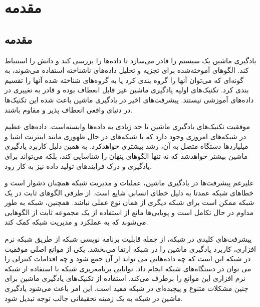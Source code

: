


\chapter{مقدمه}



\section{مقدمه}


یادگیری ماشین یک سیستم را قادر می‌سازد تا داده‌ها را بررسی کند و دانش را استنباط کند. الگوهای آموخته‌شده برای تجزیه و تحلیل داده‌های ناشناخته استفاده می‌شوند، به گونه‌ای که می‌توان آنها را گروه بندی کرد یا به گروه‌های شناخته شده آنها را تقسیم بندی کرد. تکنیک‌های اولیه یادگیری ماشین غیر قابل انعطاف بوده و قادر به تغییری در داده‌های آموزشی نیستند. پیشرفت‌های اخیر در یادگیری ماشین باعث شده این تکنیک‌ها در دنیای واقعی انعطاف پذیر و مقاوم باشند.



موفقیت تکنیک‌های یادگیری ماشین تا حد زیادی به داده‌ها وابسته‌است. داده‌های عظیم در شبکه‌های امروزی وجود دارد که با شبکه‌های در حال ظهوری مانند اینترنت اشیا و میلیاردها دستگاه متصل به آن، رشد بیشتری خواهدکرد. به همین دلیل کاربرد یادگیری ماشین بیشتر خواهدشد که نه تنها الگوهای پنهان را شناسایی کند، بلکه می‌تواند برای یادگیری و درک فرایندهای تولید داده نیز به کار رود.



علیرغم پیشرفت‌ها در یادگیری ماشین، عملیات و مدیریت شبکه همچنان دشوار است و خطاهای شبکه عمدتا به دلیل خطای انسانی شایع است. از طرفی الگوهای ثابت در یک شبکه ممکن است برای شبکه دیگری از همان نوع عملی نباشد. همچنین، شبکه به طور مداوم در حال تکامل است و پویایی‌ها مانع از استفاده از یک مجموعه ثابت از الگوهایی می‌شوند که به عملکرد و مدیریت شبکه کمک کند.



پیشرفت‌های کلیدی در شبکه، از جمله قابلیت برنامه نویسی شبکه از طریق شبکه نرم افزاری، کاربرد یادگیری ماشین را در شبکه ارتقا می‌بخشد. یکی از موانع اصلی موفقیت در شبکه‌ این است که چه داده‌هایی می تواند از آن جمع شود و چه اقدامات کنترلی را می توان در دستگاه‌های شبکه انجام داد. توانایی برنامه‌ریزی شبکه با استفاده از شبکه نرم افزاری این موانع را برطرف می‌کند. استفاده از تکنیک‌های یادگیری ماشین برای چنین مشکلات متنوع و پیچیده‌ای در شبکه مفید است. این امر باعث می‌شود یادگیری ماشین در شبکه به یک زمینه تحقیقاتی جالب توجه تبدیل شود\cite{boutaba2018comprehensive}.

\newpage

